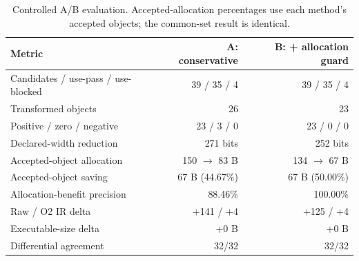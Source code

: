 \begin{table}[t]
\centering
\caption{Controlled A/B evaluation. Accepted-allocation percentages use each method's accepted objects; the common-set result is identical.}
\label{tab:ab}
\small
\begin{tabular}{lrr}
\toprule
Metric & A: conservative & B: + allocation guard \\
\midrule
Candidates / use-pass / use-blocked & 39 / 35 / 4 & 39 / 35 / 4 \\
Transformed objects & 26 & 23 \\
Positive / zero / negative & 23 / 3 / 0 & 23 / 0 / 0 \\
Declared-width reduction & 271 bits & 252 bits \\
Accepted-object allocation & 150 $\rightarrow$ 83 B & 134 $\rightarrow$ 67 B \\
Accepted-object saving & 67 B (44.67\%) & 67 B (50.00\%) \\
Allocation-benefit precision & 88.46\% & 100.00\% \\
Raw / O2 IR delta & +141 / +4 & +125 / +4 \\
Executable-size delta & +0 B & +0 B \\
Differential agreement & 32/32 & 32/32 \\
\bottomrule
\end{tabular}
\end{table}
